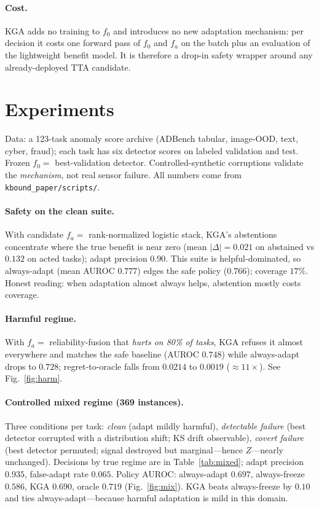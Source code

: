 \documentclass[conference]{IEEEtran}
\theoremstyle{plain}
\theoremstyle{definition}
\begin{document}
\paragraph{Cost.} \textsc{KGA} adds no training to $f_0$ and introduces no new adaptation
mechanism: per decision it costs one forward pass of $f_0$ and $f_a$ on the batch plus an
evaluation of the lightweight benefit model. It is therefore a drop-in safety wrapper around
any already-deployed TTA candidate.

\section{Experiments}\label{sec:exp}
Data: a 123-task anomaly score archive (ADBench tabular, image-OOD, text, cyber,
fraud); each task has six detector scores on labeled validation and test. Frozen
$f_0=$ best-validation detector. Controlled-synthetic corruptions validate the
\emph{mechanism}, not real sensor failure. All numbers come from
\texttt{kbound\_paper/scripts/}.

\paragraph{Safety on the clean suite.} With candidate $f_a=$ rank-normalized logistic
stack, \textsc{KGA}'s abstentions concentrate where the true benefit is near zero
(mean $|\Delta|=0.021$ on abstained vs $0.132$ on acted tasks); adapt precision $0.90$.
This suite is helpful-dominated, so always-adapt (mean AUROC $0.777$) edges the safe
policy ($0.766$); coverage $17\%$. Honest reading: when adaptation almost always helps,
abstention mostly costs coverage.

\paragraph{Harmful regime.} With $f_a=$ reliability-fusion that \emph{hurts on 80\% of
tasks}, \textsc{KGA} refuses it almost everywhere and matches the safe baseline
(AUROC $0.748$) while always-adapt drops to $0.728$; regret-to-oracle falls from
$0.0214$ to $0.0019$ ($\approx11\times$). See Fig.~\ref{fig:harm}.

\paragraph{Controlled mixed regime (369 instances).} Three conditions per task:
\emph{clean} (adapt mildly harmful), \emph{detectable failure} (best detector
corrupted with a distribution shift; KS drift observable), \emph{covert failure} (best
detector permuted; signal destroyed but marginal---hence $Z$---nearly unchanged).
Decisions by true regime are in Table~\ref{tab:mixed}; adapt precision $0.935$,
false-adapt rate $0.065$. Policy AUROC: always-adapt $0.697$, always-freeze $0.586$,
\textsc{KGA} $0.690$, oracle $0.719$ (Fig.~\ref{fig:mix}). \textsc{KGA} beats
always-freeze by $0.10$ and ties always-adapt---because harmful adaptation is mild in
this domain.
\end{document}
